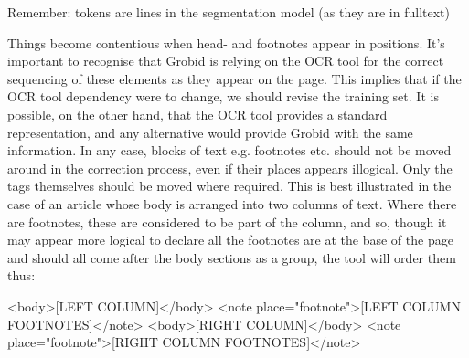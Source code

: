 \documentclass[11pt, oneside]{scrartcl}   	%
\begin{document}
Remember: tokens are lines in the segmentation model (as they are in fulltext)

Things become contentious when head- and footnotes appear in positions. It's important to recognise that Grobid is relying on the OCR tool for the correct sequencing of these elements as they appear on the page. This implies that if the OCR tool dependency were to change, we should revise the training set. It is possible, on the other hand, that the OCR tool provides a standard representation, and any alternative would provide Grobid with the same information. In any case, blocks of text e.g. footnotes etc. should not be moved around in the correction process, even if their places appears illogical. Only the tags themselves should be moved where required. This is best illustrated in the case of an article whose body is arranged into two columns of text. Where there are footnotes, these are considered to be part of the column, and so, though it may appear more logical to declare all the footnotes are at the base of the page and should all come after the body sections as a group, the tool will order them thus:

<body>[LEFT COLUMN]</body>
<note place="footnote">[LEFT COLUMN FOOTNOTES]</note>
<body>[RIGHT COLUMN]</body>
<note place="footnote">[RIGHT COLUMN FOOTNOTES]</note>
\end{document}
